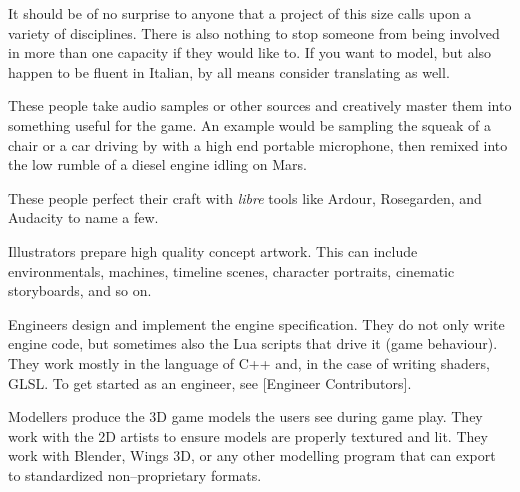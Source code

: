 
It should be of no surprise to anyone that a project of this size calls upon a variety of disciplines. There is also nothing to stop someone from being involved in more than one capacity if they would like to. If you want to model, but also happen to be fluent in Italian, by all means consider translating as well.


These people take audio samples or other sources and creatively master them into something useful for the game. An example would be sampling the squeak of a chair or a car driving by with a high end portable microphone, then remixed into the low rumble of a diesel engine idling on Mars.

These people perfect their craft with {\it libre} tools like Ardour, Rosegarden, and Audacity to name a few.





Illustrators prepare high quality concept artwork. This can include environmentals, machines, timeline scenes, character portraits, cinematic storyboards, and so on.


Engineers design and implement the engine specification. They do not only write engine code, but sometimes also the Lua scripts that drive it (game behaviour). They work mostly in the language of C++ and, in the case of writing shaders, GLSL. To get started as an engineer, see [Engineer Contributors].


Modellers produce the 3D game models the users see during game play. They work with the 2D artists to ensure models are properly textured and lit. They work with Blender, Wings 3D, or any other modelling program that can export to standardized non--proprietary formats.

